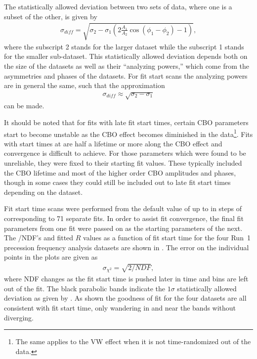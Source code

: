 The statistically allowed deviation between two sets of \gmtwo data, where one is a subset of the other, is given by \cite{E821FinalReport}
  \begin{align} \label{eq:sigmaDiffFull}
    \sigma_{diff} = \sqrt{\sigma_{2} - \sigma_{1}(2 \frac{A_{1}}{A_{2}}\cos(\phi_{1}-\phi_{2}) - 1)},
  \end{align}
where the subscript 2 stands for the larger dataset while the subscript 1 stands for the smaller sub-dataset. This statistically allowed deviation depends both on the size of the datasets as well as their ``analyzing powers,'' which come from the asymmetries and phases of the datasets. For fit start scans the analyzing powers are in general the same, such that the approximation 
  \begin{align} \label{eq:sigmaDiffApprox}
    \sigma_{diff} \approx \sqrt{\sigma_{2} - \sigma_{1}}
  \end{align}
can be made. 


It should be noted that for fits with late fit start times, certain CBO parameters start to become unstable as the CBO effect becomes diminished in the data\footnote{The same applies to the VW effect when it is not time-randomized out of the data.}. Fits with start times at  are half a lifetime or more along the CBO effect and convergence is difficult to achieve. For those parameters which were found to be unreliable, they were fixed to their starting fit values. These typically included the CBO lifetime and most of the higher order CBO amplitudes and phases, though in some cases they could still be included out to late fit start times depending on the dataset.


Fit start time scans were performed from the default value of  up to  in steps of  corresponding to 71 separate fits. In order to assist fit convergence, the final fit parameters from one fit were passed on as the starting parameters of the next. The \chisq/NDF's and fitted $R$ values as a function of fit start time for the four Run~1 precession frequency analysis datasets are shown in . The error on the individual points in the \chisq plots are given as 
  \begin{align}
    \sigma_{\chi^{2}} = \sqrt{2/NDF},
  \end{align}
where NDF changes as the fit start time is pushed later in time and bins are left out of the fit. The black parabolic bands indicate the $1\sigma$ statistically allowed deviation as given by . As shown the goodness of fit for the four datasets are all consistent with fit start time, only wandering in and near the bands without diverging.


